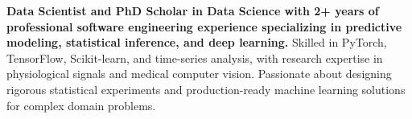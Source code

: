 \documentclass[../main.tex]{subfiles}
\begin{document}
\textbf{Data Scientist and PhD Scholar in Data Science with 2+ years of professional software engineering experience specializing in predictive modeling, statistical inference, and deep learning.}
Skilled in PyTorch, TensorFlow, Scikit-learn, and time-series analysis, with research expertise in physiological signals and medical computer vision.
Passionate about designing rigorous statistical experiments and production-ready machine learning solutions for complex domain problems.
\end{document}
